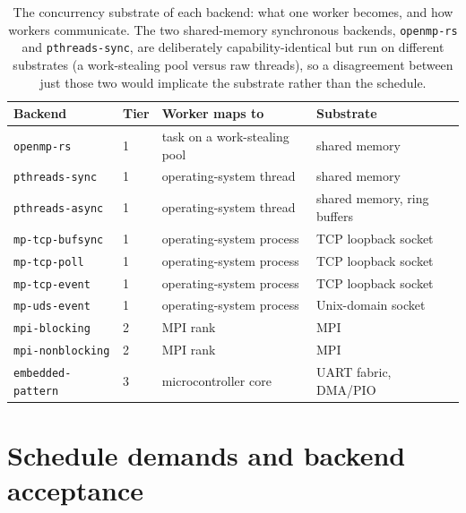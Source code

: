 \begin{table}[htbp]
  \centering
  \footnotesize
  \setlength{\tabcolsep}{5pt}
  \begin{tabular}{@{}llll@{}}
    \toprule
    Backend & Tier & Worker maps to & Substrate \\
    \midrule
    \texttt{openmp-rs}       & 1 & task on a work-stealing pool & shared memory \\
    \texttt{pthreads-sync}   & 1 & operating-system thread      & shared memory \\
    \texttt{pthreads-async}  & 1 & operating-system thread      & shared memory, ring buffers \\
    \texttt{mp-tcp-bufsync}  & 1 & operating-system process     & TCP loopback socket \\
    \texttt{mp-tcp-poll}     & 1 & operating-system process     & TCP loopback socket \\
    \texttt{mp-tcp-event}    & 1 & operating-system process     & TCP loopback socket \\
    \texttt{mp-uds-event}    & 1 & operating-system process     & Unix-domain socket \\
    \texttt{mpi-blocking}    & 2 & MPI rank                     & MPI \\
    \texttt{mpi-nonblocking} & 2 & MPI rank                     & MPI \\
    \texttt{embedded-pattern}& 3 & microcontroller core         & UART fabric, DMA/PIO \\
    \bottomrule
  \end{tabular}
  \caption{The concurrency substrate of each backend: what one worker becomes, and
  how workers communicate. The two shared-memory synchronous backends,
  \texttt{openmp-rs} and \texttt{pthreads-sync}, are deliberately
  capability-identical but run on different substrates (a work-stealing pool versus
  raw threads), so a disagreement between just those two would implicate the
  substrate rather than the schedule.}
  \label{tab:cap-substrate}
\end{table}

\section{Schedule demands and backend acceptance}

